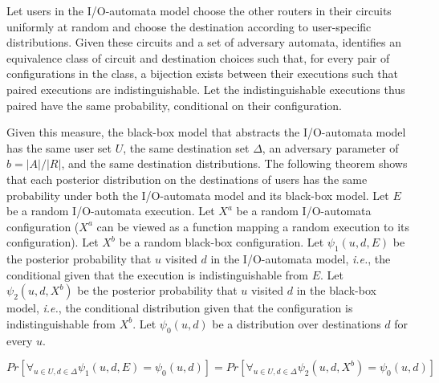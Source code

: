 \documentclass[prodmode,acmtissec]{acmsmall}
\begin{document}
Let users in the I/O-automata model choose the other routers in their circuits uniformly at random and choose the destination according to user-specific distributions.  Given these circuits and a set of adversary automata,  identifies an equivalence class of circuit and destination choices such that, for every pair of configurations in the class, a bijection exists between their executions such that paired executions are indistinguishable.  Let the indistinguishable executions thus paired have the same probability, conditional on their configuration.

Given this measure, the black-box model that abstracts the I/O-automata model has the same user set $U$, the same destination set $\Delta$, an adversary parameter of $b = |A|/|R|$, and the same destination distributions.  The following theorem shows that each posterior distribution on the destinations of users has the same probability under both the I/O-automata model and its black-box model.  Let $E$ be a random I/O-automata execution.  Let $X^a$ be a random I/O-automata configuration ($X^a$ can be viewed as a function mapping a random execution to its configuration).  Let $X^b$ be a random black-box configuration.  Let $\psi_1(u,d,E)$ be the posterior probability that $u$ visited $d$ in the I/O-automata model, \emph{i.e.}, the conditional given that the execution is indistinguishable from $E$.  Let $\psi_2(u,d,X^b)$ be the posterior probability that $u$ visited $d$ in the black-box model, \emph{i.e.}, the conditional distribution given that the configuration is indistinguishable from $X^b$.  Let $\psi_0(u,d)$ be a distribution over destinations $d$ for every $u$.
\begin{theorem}
\begin{equation*}
Pr[\forall_{u\in U, d\in \Delta} \psi_1(u,d,E) = \psi_0(u,d)] = Pr[\forall_{u\in U, d\in \Delta} \psi_2(u,d,X^b) = \psi_0(u,d)]
\end{equation*}
\end{theorem}
\end{document}
